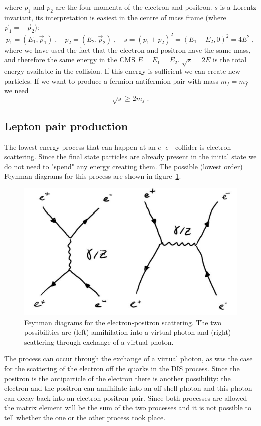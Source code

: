\documentclass[12pt]{article}
\begin{document}
where $p_1$ and $p_2$ are the four-momenta of the electron and positron. $s$ is a Lorentz invariant, its interpretation is easiest in the centre of mass frame (where $\vec p_1=-\vec p_2$):
\[p_1=(E_1,\vec p_1)\;,\quad p_2=(E_2,\vec p_2)\;,\quad s=(p_1+p_2)^2=(E_1+E_2,0)^2=4E^2\;,\]
where we have used the fact that the electron and positron have the same mass, and therefore the same energy in the CMS $E=E_1=E_2$. $\sqrt{s}=2E$ is the total energy available in the collision. If this energy is sufficient we can create new particles. If we want to produce a fermion-antifermion pair with mass $m_f=m_{\bar f}$ we need 
\[\sqrt{s}\geq 2m_f\;.\]
\subsection{Lepton pair production}
The lowest energy process that can happen at an $e^+e^-$ collider is electron scattering. Since the final state particles are already present in the initial state we do not need to "spend" any energy creating them. The possible (lowest order) Feynman diagrams for this process are shown in figure~\ref{fig:epemepem}. 
\begin{figure}
\begin{center}
\includegraphics[scale=0.27]{images/epemepem.png}
\end{center}
\caption{Feynman diagrams for the electron-positron scattering. The two possibilities are (left) annihilation into a virtual photon and (right) scattering through exchange of a virtual photon.}\label{fig:epemepem}
\end{figure}
The process can occur through the exchange of a virtual photon, as was the case for the scattering of the electron off the quarks in the DIS process. Since the positron is the antiparticle of the electron there is another possibility: the electron and the positron can annihilate into an off-shell photon and this photon can decay back into an electron-positron pair. Since both processes are allowed the matrix element will be the sum of the two processes and it is not possible to tell whether the one or the other process took place. 
\end{document}
